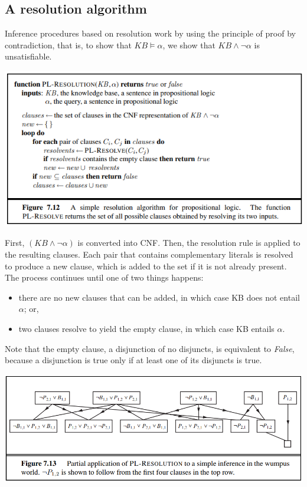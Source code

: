 \subsection{A resolution algorithm}
Inference procedures based on resolution work by using the principle of proof by contradiction, that is, to show that $KB \vDash \alpha$, we show that $KB \land \neg{\alpha}$ is unsatisfiable.
\begin{center}
    \includegraphics[]{images/resolution algorithm.png}
\end{center}
First, $(KB \land \neg{\alpha})$ is converted into CNF. Then, the resolution rule is applied to the resulting clauses. Each pair that contains complementary literals is resolved to produce a new clause, which is added to the set if it is not already present. The process continues until one of two things happens:
\begin{itemize}
    \item there are no new clauses that can be added, in which case KB does not entail $\alpha$; or,

    \item two clauses resolve to yield the empty clause, in which case KB entails $\alpha$. 
\end{itemize}
Note that the empty clause, a disjunction of no disjuncts, is equivalent to \textit{False}, because a disjunction is true only if at least one of its disjuncts is true.
\begin{center}
    \includegraphics[]{images/resolution-wumpus2.png}
\end{center}
